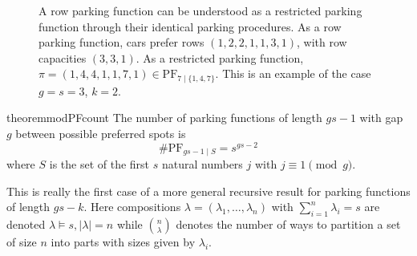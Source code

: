 \documentclass[12pt]{article}
\begin{document}
\begin{figure}[h]
    \caption{A row parking function can be understood as a restricted parking function through their identical parking procedures. As a row parking function, cars prefer rows $(1,2,2,1,1,3,1)$, with row capacities $(3,3,1)$. As a restricted parking function, $\pi = (1, 4, 4, 1, 1, 7, 1) \in \mathrm{PF}_{7 \mid \{ 1, 4, 7 \}}$. This is an example of the case $g = s = 3$, $k = 2$.}
    \label{fig:row-parking}
\end{figure}


\begin{restatable}{theorem}{modPFcount}
	\label{thm:modPFcount}
	The number of parking functions of length $gs - 1$ with gap $g$ between possible preferred spots is
	\[
		\# \mathrm{PF}_{gs - 1 \mid S} = s^{gs - 2}
	\]
	where $S$ is the set of the first $s$ natural numbers $j$ with $j \equiv 1 \pmod g$.
\end{restatable}

This is really the first case of a more general recursive result for parking functions of length $gs - k$. Here compositions $\lambda = (\lambda_{1}, \dots, \lambda_{n})$ with $\sum_{i = 1}^{n} \lambda_{i} = s$ are denoted $\lambda\vDash s, \lvert\lambda\rvert = n$ while $\binom{n}{\lambda}$ denotes the number of ways to partition a set of size $n$ into parts with sizes given by $\lambda_i$.
\end{document}
